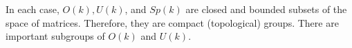 In each case, $O(k), U(k)$, and $Sp(k)$ are closed and bounded subsets of the space of matrices. Therefore, they are compact (topological) groups. There are important subgroups of $O(k)$ and $U(k)$.
